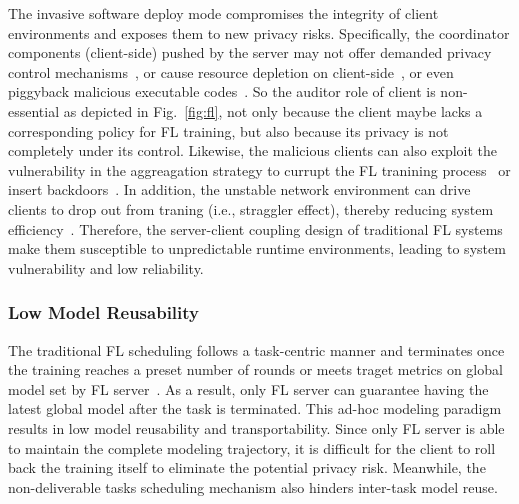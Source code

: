 The invasive software deploy mode compromises the integrity of client environments and exposes them to new privacy risks.
Specifically, the coordinator components (client-side) pushed by the server may not offer demanded privacy control mechanisms~\cite{zeng2023fedlab, caldas2018leaf, mcmahan2017communication}, or cause resource depletion on client-side~\cite{bonawitz2019towards, niu2020billion, chen2020deep}, or even piggyback malicious executable codes~\cite{li2017understanding}.
So the auditor role of client is non-essential as depicted in Fig.~\ref{fig:fl}, not only because the client maybe lacks a corresponding policy for FL training, but also because its privacy is not completely under its control.
Likewise, the malicious clients can also exploit the vulnerability in the aggreagation strategy to currupt the FL tranining process~\cite{bouacida2021vulnerabilities, sattler2020byzantine, park2021sageflow, fang2020local} or insert backdoors~\cite{bagdasaryan2020backdoor, wang2020attack}.
In addition, the unstable network environment can drive clients to drop out from traning (i.e., straggler effect), thereby reducing system efficiency~\cite{reisizadeh2019robust, park2021sageflow}.
Therefore, the server-client coupling design of traditional FL systems make them susceptible to unpredictable runtime environments, leading to system vulnerability and low reliability.

\subsubsection{Low Model Reusability} %
The traditional FL scheduling follows a task-centric manner and terminates once the training reaches a preset number of rounds or meets traget metrics on global model set by FL server~\cite{bonawitz2019towards}.
As a result, only FL server can guarantee having the latest global model after the task is terminated.
This ad-hoc modeling paradigm results in low model reusability and transportability.
Since only FL server is able to maintain the complete modeling trajectory, it is difficult for the client to roll back the training itself to eliminate the potential privacy risk.
Meanwhile, the non-deliverable tasks scheduling mechanism also hinders inter-task model reuse.%

